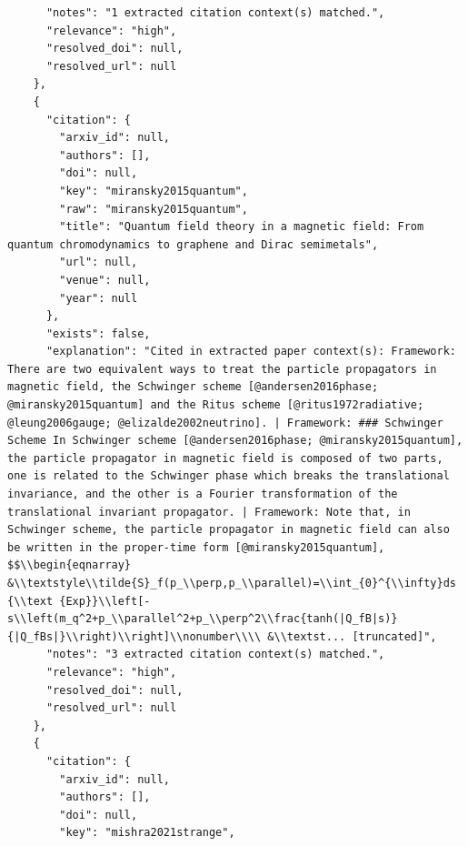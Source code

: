 \documentclass[11pt]{article}
\begin{document}
\begin{verbatim}
      "notes": "1 extracted citation context(s) matched.",
      "relevance": "high",
      "resolved_doi": null,
      "resolved_url": null
    },
    {
      "citation": {
        "arxiv_id": null,
        "authors": [],
        "doi": null,
        "key": "miransky2015quantum",
        "raw": "miransky2015quantum",
        "title": "Quantum field theory in a magnetic field: From quantum chromodynamics to graphene and Dirac semimetals",
        "url": null,
        "venue": null,
        "year": null
      },
      "exists": false,
      "explanation": "Cited in extracted paper context(s): Framework: There are two equivalent ways to treat the particle propagators in magnetic field, the Schwinger scheme [@andersen2016phase; @miransky2015quantum] and the Ritus scheme [@ritus1972radiative; @leung2006gauge; @elizalde2002neutrino]. | Framework: ### Schwinger Scheme In Schwinger scheme [@andersen2016phase; @miransky2015quantum], the particle propagator in magnetic field is composed of two parts, one is related to the Schwinger phase which breaks the translational invariance, and the other is a Fourier transformation of the translational invariant propagator. | Framework: Note that, in Schwinger scheme, the particle propagator in magnetic field can also be written in the proper-time form [@miransky2015quantum], $$\\begin{eqnarray} &\\textstyle\\tilde{S}_f(p_\\perp,p_\\parallel)=\\int_{0}^{\\infty}ds {\\text {Exp}}\\left[-s\\left(m_q^2+p_\\parallel^2+p_\\perp^2\\frac{tanh(|Q_fB|s)}{|Q_fBs|}\\right)\\right]\\nonumber\\\\ &\\textst... [truncated]",
      "notes": "3 extracted citation context(s) matched.",
      "relevance": "high",
      "resolved_doi": null,
      "resolved_url": null
    },
    {
      "citation": {
        "arxiv_id": null,
        "authors": [],
        "doi": null,
        "key": "mishra2021strange",

\end{verbatim}
\end{document}
